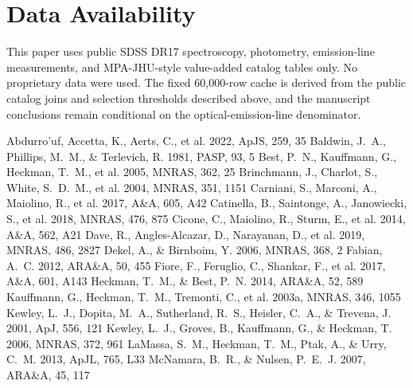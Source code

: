 \documentclass[twocolumn]{aastex631}
\begin{document}
\section*{Data Availability}
This paper uses public SDSS DR17 spectroscopy, photometry, emission-line measurements, and MPA-JHU-style value-added catalog tables only. No proprietary data were used. The fixed 60,000-row cache is derived from the public catalog joins and selection thresholds described above, and the manuscript conclusions remain conditional on the optical-emission-line denominator.


\begin{thebibliography}{}
 Abdurro'uf, Accetta, K., Aerts, C., et al. 2022, ApJS, 259, 35
 Baldwin, J.~A., Phillips, M.~M., \& Terlevich, R. 1981, PASP, 93, 5
 Best, P.~N., Kauffmann, G., Heckman, T.~M., et al. 2005, MNRAS, 362, 25
 Brinchmann, J., Charlot, S., White, S.~D.~M., et al. 2004, MNRAS, 351, 1151
 Carniani, S., Marconi, A., Maiolino, R., et al. 2017, A\&A, 605, A42
 Catinella, B., Saintonge, A., Janowiecki, S., et al. 2018, MNRAS, 476, 875
 Cicone, C., Maiolino, R., Sturm, E., et al. 2014, A\&A, 562, A21
 Dave, R., Angles-Alcazar, D., Narayanan, D., et al. 2019, MNRAS, 486, 2827
 Dekel, A., \& Birnboim, Y. 2006, MNRAS, 368, 2
 Fabian, A.~C. 2012, ARA\&A, 50, 455
 Fiore, F., Feruglio, C., Shankar, F., et al. 2017, A\&A, 601, A143
 Heckman, T.~M., \& Best, P.~N. 2014, ARA\&A, 52, 589
 Kauffmann, G., Heckman, T.~M., Tremonti, C., et al. 2003a, MNRAS, 346, 1055
 Kewley, L.~J., Dopita, M.~A., Sutherland, R.~S., Heisler, C.~A., \& Trevena, J. 2001, ApJ, 556, 121
 Kewley, L.~J., Groves, B., Kauffmann, G., \& Heckman, T. 2006, MNRAS, 372, 961
 LaMassa, S.~M., Heckman, T.~M., Ptak, A., \& Urry, C.~M. 2013, ApJL, 765, L33
 McNamara, B.~R., \& Nulsen, P.~E.~J. 2007, ARA\&A, 45, 117

\end{thebibliography}
\end{document}
